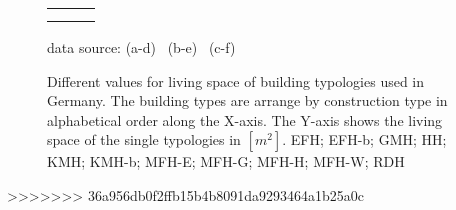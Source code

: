 \begin{figure}[htb]
\vspace{-1cm} 

\hspace{-2.5cm}
  \begin{tabular}{p{0.33\linewidth} p{0.33\linewidth} p{0.33\linewidth}}
&
&
\\

\vspace{-3cm} 
& \vspace{-3cm} 
& \vspace{-3cm}
\\
    \end{tabular}
    
\vspace{-1.6cm}
\begin{flushright}
\footnotesize{data source:
(a-d)~\cite{Blesl.2007}
(b-e)~\cite{Loga.2011}
(c-f)~\cite{Born.2003}
}
\end{flushright}
	\caption[Different values for living space of building typologies used in
	Germany.]{Different values for living space of building typologies used in
	Germany.
    The building types are arrange by construction type in alphabetical order
    along the X-axis.
	The Y-axis shows the living space of the single typologies in
	$[m^2]$.
	EFH; EFH-b; GMH; HH; KMH; KMH-b; MFH-E; MFH-G; MFH-H; MFH-W; RDH}
    \label{fig:DifTypArea}
\end{figure}
>>>>>>> 36a956db0f2ffb15b4b8091da9293464a1b25a0c